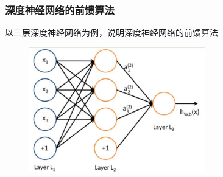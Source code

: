 \frame
{
	\frametitle{深度神经网络的前馈算法}
	以三层深度神经网络为例，说明深度神经网络的前馈算法
\begin{figure}[h!]
\centering
\includegraphics[width=3.0in]{Figures/DNN_front_pro.jpg}
\label{Fig:DNN_front_pro}
\end{figure}
}

